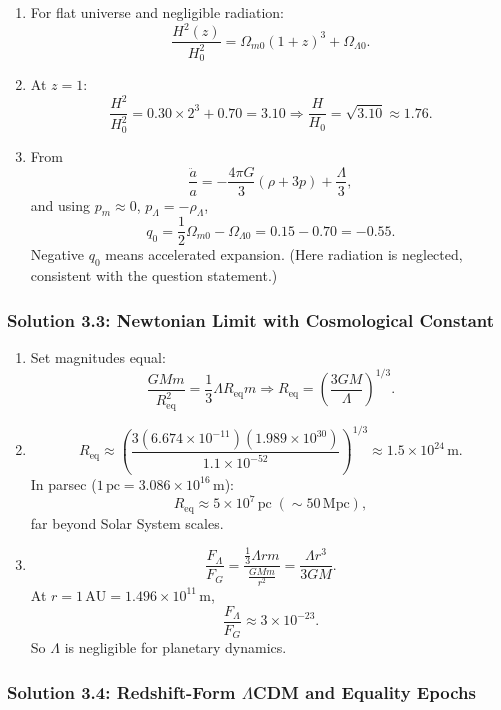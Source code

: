 \begin{enumerate}[label=(\alph*)]
  \item For flat universe and negligible radiation:
  \[
    \frac{H^2(z)}{H_0^2}=\Omega_{m0}(1+z)^3+\Omega_{\Lambda0}.
  \]

  \item At $z=1$:
  \[
    \frac{H^2}{H_0^2}=0.30\times 2^3 + 0.70 = 3.10
    \Rightarrow \frac{H}{H_0}=\sqrt{3.10}\approx 1.76.
  \]

  \item From
  \[
    \frac{\ddot a}{a}=-\frac{4\pi G}{3}(\rho+3p)+\frac{\Lambda}{3},
  \]
  and using $p_m\approx 0$, $p_\Lambda=-\rho_\Lambda$,
  \[
    q_0 = \frac{1}{2}\Omega_{m0}-\Omega_{\Lambda0}
    = 0.15-0.70 = -0.55.
  \]
  Negative $q_0$ means accelerated expansion. (Here radiation is neglected, consistent with the question statement.)
\end{enumerate}

\subsubsection*{Solution 3.3: Newtonian Limit with Cosmological Constant}

\begin{enumerate}[label=(\alph*)]
  \item Set magnitudes equal:
  \[
    \frac{GMm}{R_\mathrm{eq}^2}=\frac{1}{3}\Lambda R_\mathrm{eq}m
    \Rightarrow
    R_\mathrm{eq}=\left(\frac{3GM}{\Lambda}\right)^{1/3}.
  \]

  \item
  \[
    R_\mathrm{eq}\approx \left(\frac{3(6.674\times10^{-11})(1.989\times10^{30})}{1.1\times10^{-52}}\right)^{1/3}
    \approx 1.5\times10^{24}\,\mathrm{m}.
  \]
  In parsec ($1\,\mathrm{pc}=3.086\times10^{16}\,\mathrm{m}$):
  \[
    R_\mathrm{eq}\approx 5\times10^7\,\mathrm{pc} \;(\sim 50\,\mathrm{Mpc}),
  \]
  far beyond Solar System scales.

  \item
  \[
    \frac{F_\Lambda}{F_G}=
    \frac{\frac13\Lambda r m}{\frac{GMm}{r^2}}=
    \frac{\Lambda r^3}{3GM}.
  \]
  At $r=1\,\mathrm{AU}=1.496\times10^{11}\,\mathrm{m}$,
  \[
    \frac{F_\Lambda}{F_G}\approx 3\times10^{-23}.
  \]
  So $\Lambda$ is negligible for planetary dynamics.
\end{enumerate}

\subsubsection*{Solution 3.4: Redshift-Form $\Lambda$CDM and Equality Epochs}

